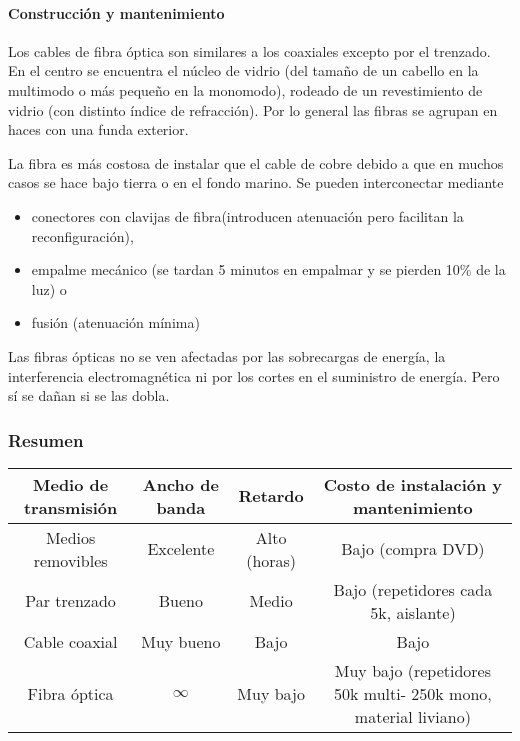 \documentclass{book}
\begin{document}
	\paragraph{Construcción y mantenimiento}
	Los cables de fibra óptica son similares a los coaxiales excepto por el trenzado. En el centro se encuentra el núcleo de vidrio (del tamaño de un cabello en la multimodo o más pequeño en la monomodo), rodeado de un revestimiento de vidrio (con distinto índice de refracción). Por lo general las fibras se agrupan en haces con una funda exterior.
	
	\vspace{3mm}
	La fibra es más costosa de instalar que el cable de cobre debido a que en muchos casos se hace bajo tierra o en el fondo marino. Se pueden interconectar mediante 
	
	\begin{itemize}
		\item conectores con clavijas de fibra(introducen atenuación pero facilitan la reconfiguración),
		\item empalme mecánico (se tardan 5 minutos en empalmar y se pierden 10\% de la luz) o
		\item fusión (atenuación mínima)
	\end{itemize}
	
	Las fibras ópticas no se ven afectadas por las sobrecargas de energía, la interferencia electromagnética ni por los cortes en el suministro de energía. Pero sí se dañan si se las dobla.
	
	\subsubsection{Resumen}
	\begin{table}[H]
		\centering
		\begin{tabular}{|c|c|c|c|}
			\hline
			Medio de transmisión&Ancho de banda&Retardo&Costo de instalación y mantenimiento\\
			\hline
			\hline
			Medios removibles&Excelente&Alto (horas)&Bajo (compra DVD)\\
			\hline
			Par trenzado&Bueno&Medio&Bajo (repetidores cada 5k, aislante)\\
			\hline
			Cable coaxial&Muy bueno&Bajo&Bajo\\
			\hline
			Fibra óptica&$\infty$&Muy bajo&Muy bajo (repetidores 50k multi- 250k mono, material liviano)\\
			\hline
		\end{tabular}
	\end{table}
	
\end{document}
